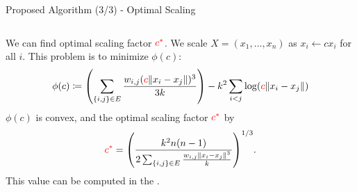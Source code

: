 \documentclass[dvipdfmx,13pt,aspectratio=169]{beamer}
\newcommand{\red}[1]{\textcolor{red}{#1}}
\newcommand{\defeq}{\coloneqq}
\newif\ifShowHidden
\begin{document}
\begin{frame}{Proposed Algorithm (3/3) - Optimal Scaling}
  \begin{columns}
    \begin{column}{0.75\columnwidth}
      We can find optimal scaling factor $\red{c^*}$.
      We scale $X = (x_1, \dots, x_n)$ as $x_i \gets c x_i$ for all $i$.
      This problem is to minimize $\phi(c)$:
      \begin{equation*}
        \phi(c) \defeq \qty(\sum_{\{i,j\} \in E} \frac{w_{i,j} (\red{c} \norm{x_i - x_j})^3}{3k}) - k^2 \sum_{i < j} \log(\red{c} \norm{x_i - x_j})
      \end{equation*}
      $\phi(c)$ is convex, and the optimal scaling factor $\red{c^*}$ by
      \begin{equation}\label{eq:scaling}
        \red{c^*} = \qty(\frac{k^2 n(n-1)}{2 \sum_{\{i,j\} \in E} \frac{w_{i,j} \norm{x_i - x_j}^3}{k}})^{1/3}.
      \end{equation}
      This value can be computed in the .


\end{column}
\end{columns}
\end{frame}
\end{document}
